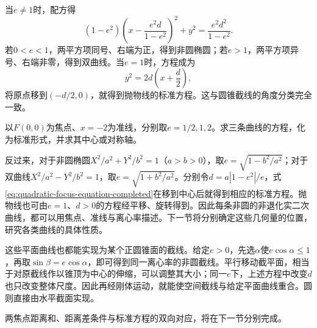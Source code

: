 当\(e\ne1\)时，配方得
\begin{equation}\label{eq:quadratic-focus-equation-completed}
    (1-e^2)\left(x-\frac{e^2d}{1-e^2}\right)^2+y^2
    =\frac{e^2d^2}{1-e^2} .
\end{equation}
若\(0<e<1\)，两平方项同号、右端为正，得到非圆椭圆；若\(e>1\)，两平方项异号、右端非零，得到双曲线。当\(e=1\)时，方程成为
\begin{equation*}
    y^2=2d\left(x+\frac d2\right) ,
\end{equation*}
将原点移到\((-d/2,0)\)，就得到抛物线的标准方程。这与圆锥截线的角度分类完全一致。

\begin{example}\label{ex:quadratic-focus-directrix-equations}
以\(F(0,0)\)为焦点、\(x=-2\)为准线，分别取\(e=1/2,1,2\)。求三条曲线的方程，化为标准形式，并求其中心或对称轴。
\end{example}

反过来，对于非圆椭圆\(X^2/a^2+Y^2/b^2=1\)（\(a>b>0\)），取\(e=\sqrt{1-b^2/a^2}\)；对于双曲线\(X^2/a^2-Y^2/b^2=1\)，取\(e=\sqrt{1+b^2/a^2}\)。分别令\(d=a|1-e^2|/e\)，式\eqref{eq:quadratic-focus-equation-completed}在移到中心后就得到相应的标准方程。抛物线也可由\(e=1\)、\(d>0\)的方程经平移、旋转得到。因此每条非圆的非退化实二次曲线，都可以用焦点、准线与离心率描述。下一节将分别确定这些几何量的位置，研究各类曲线的具体性质。

这些平面曲线也都能实现为某个正圆锥面的截线。给定\(e>0\)，先选\(\alpha\)使\(e\cos\alpha\le1\)，再取\(\sin\beta=e\cos\alpha\)，即可得到同一离心率的非圆截线。平行移动截平面，相当于对原截线作以锥顶为中心的伸缩，可以调整其大小；同一\(e\)下，上述方程中改变\(d\)也只改变整体尺度。因此再经刚体运动，就能使空间截线与给定平面曲线重合。圆则直接由水平截面实现。

两焦点距离和、距离差条件与标准方程的双向对应，将在下一节分别完成。

